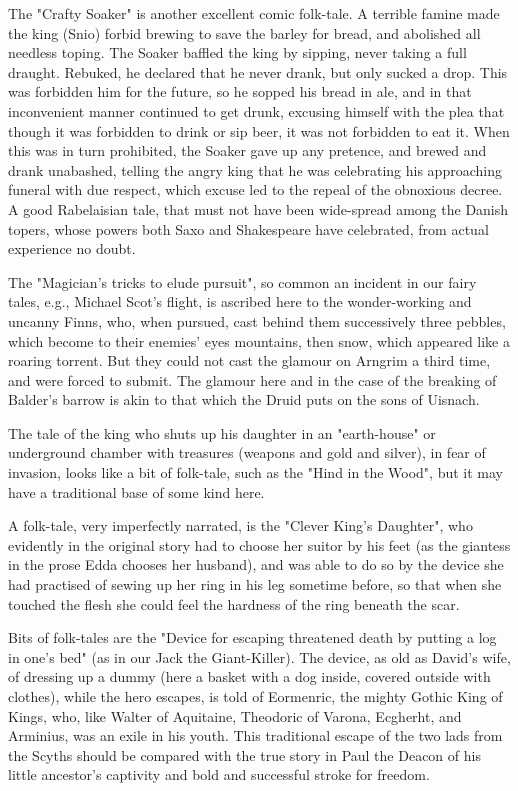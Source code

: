 \documentclass[10pt,a4paper]{report}
\begin{document}
The "Crafty Soaker" is another excellent comic folk-tale. A terrible famine made the king (Snio) forbid brewing to save the barley for bread, and abolished all needless toping. The Soaker baffled the king by sipping, never taking a full draught. Rebuked, he declared that he never drank, but only sucked a drop. This was forbidden him for the future, so he sopped his bread in ale, and in that inconvenient manner continued to get drunk, excusing himself with the plea that though it was forbidden to drink or sip beer, it was not forbidden to eat it. When this was in turn prohibited, the Soaker gave up any pretence, and brewed and drank unabashed, telling the angry king that he was celebrating his approaching funeral with due respect, which excuse led to the repeal of the obnoxious decree. A good Rabelaisian tale, that must not have been wide-spread among the Danish topers, whose powers both Saxo and Shakespeare have celebrated, from actual experience no doubt.

The "Magician's tricks to elude pursuit", so common an incident in our fairy tales, e.g., Michael Scot's flight, is ascribed here to the wonder-working and uncanny Finns, who, when pursued, cast behind them successively three pebbles, which become to their enemies' eyes mountains, then snow, which appeared like a roaring torrent. But they could not cast the glamour on Arngrim a third time, and were forced to submit. The glamour here and in the case of the breaking of Balder's barrow is akin to that which the Druid puts on the sons of Uisnach.

The tale of the king who shuts up his daughter in an "earth-house" or underground chamber with treasures (weapons and gold and silver), in fear of invasion, looks like a bit of folk-tale, such as the "Hind in the Wood", but it may have a traditional base of some kind here.

A folk-tale, very imperfectly narrated, is the "Clever King's Daughter", who evidently in the original story had to choose her suitor by his feet (as the giantess in the prose Edda chooses her husband), and was able to do so by the device she had practised of sewing up her ring in his leg sometime before, so that when she touched the flesh she could feel the hardness of the ring beneath the scar.

Bits of folk-tales are the "Device for escaping threatened death by putting a log in one's bed" (as in our Jack the Giant-Killer). The device, as old as David's wife, of dressing up a dummy (here a basket with a dog inside, covered outside with clothes), while the hero escapes, is told of Eormenric, the mighty Gothic King of Kings, who, like Walter of Aquitaine, Theodoric of Varona, Ecgherht, and Arminius, was an exile in his youth. This traditional escape of the two lads from the Scyths should be compared with the true story in Paul the Deacon of his little ancestor's captivity and bold and successful stroke for freedom.
\end{document}
